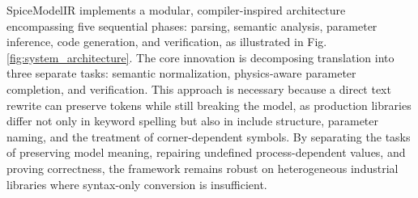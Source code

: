 \documentclass[conference]{IEEEtran}
\begin{document}
SpiceModelIR implements a modular, compiler-inspired architecture encompassing five sequential phases: parsing, semantic analysis, parameter inference, code generation, and verification, as illustrated in Fig. \ref{fig:system_architecture}. The core innovation is decomposing translation into three separate tasks: semantic normalization, physics-aware parameter completion, and verification. This approach is necessary because a direct text rewrite can preserve tokens while still breaking the model, as production libraries differ not only in keyword spelling but also in include structure, parameter naming, and the treatment of corner-dependent symbols. By separating the tasks of preserving model meaning, repairing undefined process-dependent values, and proving correctness, the framework remains robust on heterogeneous industrial libraries where syntax-only conversion is insufficient.
\end{document}
